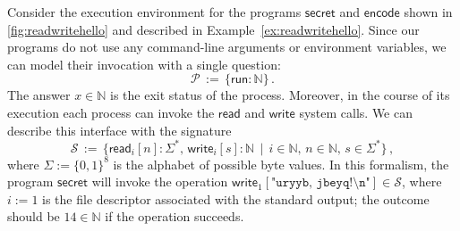 \documentclass[acmsmall,nonacm]{acmart}
\newcommand{\kw}[1]{\ensuremath{ \mathsf{#1} }}
\begin{document}

\begin{example} \label{ex:fdsig} %
Consider the execution environment
for the programs \kw{secret} and \kw{encode}
shown in \autoref{fig:readwritehello} and
described in Example~\ref{ex:readwritehello}.
Since our programs
do not use any command-line arguments or environment variables,
we can model their invocation with a single question:
\[
  \mathcal{P} \, := \,
    \{ \kw{run} : \mathbb{N} \}
  \,.
\]
The answer $x \in \mathbb{N}$ is the exit status of the process.
Moreover, in the course of its execution
each process can invoke the \kw{read} and \kw{write} system calls.
We can describe this interface with the signature
\[
  \mathcal{S} \, := \, \{
    \kw{read}_i[n] \mathbin: \Sigma^* , \,
    \kw{write}_i[s] \mathbin: \mathbb{N} \, \mid \,
    i \in \mathbb{N}, \,
    n \in \mathbb{N}, \,
    s \in \Sigma^*
  \}
  \,,
\]
where $\Sigma := \{0,1\}^8$ is the alphabet of possible byte values.
In this formalism,
the program \kw{secret} will invoke
the operation
$\kw{write}_1[\texttt{"uryyb, jbeyq!\textbackslash{}n"}]
 \in \mathcal{S}$,
where $i := 1$ is the file descriptor associated with the standard output;
the outcome should be $14 \in \mathbb{N}$
if the operation succeeds.
\end{example}
\end{document}
